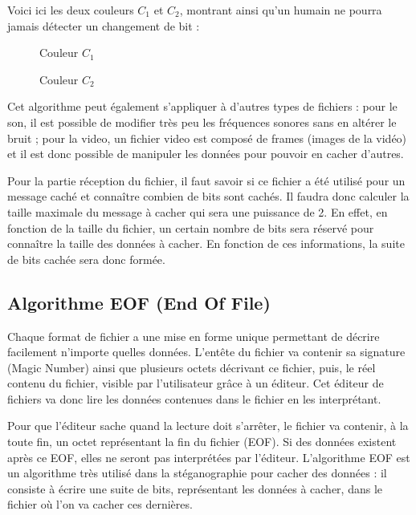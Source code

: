 \documentclass[11pt]{article}
\begin{document}
Voici ici les deux couleurs $C_1$ et $C_2$, montrant ainsi qu'un humain ne pourra jamais détecter un changement de bit : 

\begin{figure}[h]
 \begin{minipage}{.46\linewidth}
  \centering{}
  \caption{Couleur $C_1$}
 \end{minipage} \hfill
 \begin{minipage}{.46\linewidth}
  \centering{}
  \caption{Couleur $C_2$}
 \end{minipage}
\end{figure}

Cet algorithme peut également s'appliquer à d'autres types de fichiers : pour le son, il est possible de modifier très peu les fréquences sonores sans en altérer le bruit ; 
pour la video, un fichier video est composé de frames (images de la vidéo) et il est donc possible de manipuler les données pour pouvoir en cacher d'autres. 

Pour la partie réception du fichier, il faut savoir si ce fichier a été utilisé pour un message caché et connaître combien de bits sont cachés. 
Il faudra donc calculer la taille maximale du message à cacher qui sera une puissance de 2. En effet, en fonction de la taille du fichier, un certain nombre de bits sera réservé pour connaître la taille 
des données à cacher. 
En fonction de ces informations, la suite de bits cachée sera donc formée.

\subsection{Algorithme EOF (End Of File)}
Chaque format de fichier a une mise en forme unique permettant de décrire facilement n'importe quelles données. 
L'entête du fichier va contenir sa signature (Magic Number) ainsi que plusieurs octets décrivant ce fichier, puis, le réel contenu du fichier, visible par l'utilisateur grâce à un éditeur. 
Cet éditeur de fichiers va donc lire les données contenues dans le fichier en les interprétant. 

Pour que l'éditeur sache quand la lecture doit s'arrêter, le fichier va contenir, à la toute fin, un octet représentant la fin du fichier (EOF). 
Si des données existent après ce EOF, elles ne seront pas interprétées par l'éditeur. 
L'algorithme EOF est un algorithme très utilisé dans la stéganographie pour cacher des données : il consiste à écrire une suite de bits, représentant les données à cacher, dans le fichier où l'on va cacher ces dernières. 
\end{document}
